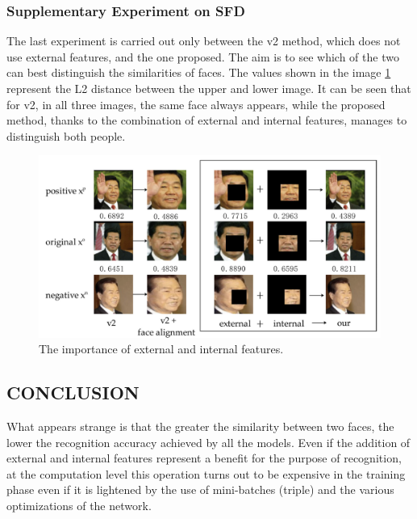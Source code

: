 \subsubsection{Supplementary Experiment on SFD}
The last experiment is carried out only between the v2 method, which does 
not use external features, and the one proposed. The aim is to see which of 
the two can best distinguish the similarities of faces. The values shown in the 
image \ref{fig:fei} represent the L2 distance between the upper and lower image. It can 
be seen that for v2, in all three images, the same face always appears, while 
the proposed method, thanks to the combination of external and internal 
features, manages to distinguish both people.
\begin{figure}[h!]
    \centering
    \includegraphics[width = 0.8\linewidth]{images/paper9/features.png}
    \centering
    \caption{The importance of external and internal features.}
    \label{fig:fei}
\end{figure}

\subsection{CONCLUSION}
What appears strange is that the greater the similarity between two faces, 
the lower the recognition accuracy achieved by all the models. Even if the 
addition of external and internal features represent a benefit for the purpose 
of recognition, at the computation level this operation turns out to be expensive 
in the training phase even if it is lightened by the use of mini-batches 
(triple) and the various optimizations of the network.
